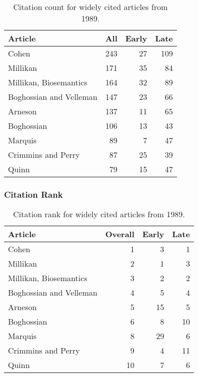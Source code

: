 \documentclass[
  10pt,
  letterpaper,
  DIV=11,
  numbers=noendperiod,
  twoside]{scrartcl}
\begin{document}
\begin{longtable}[]{@{}lrrr@{}}

\caption{\label{tbl-citation-count-1989}Citation count for widely cited
articles from 1989.}

\tabularnewline

\toprule\noalign{}
Article & All & Early & Late \\
\midrule\noalign{}
\endhead
\bottomrule\noalign{}
\endlastfoot
Cohen & 243 & 27 & 109 \\
Millikan & 171 & 35 & 84 \\
Millikan, Biosemantics & 164 & 32 & 89 \\
Boghossian and Velleman & 147 & 23 & 66 \\
Arneson & 137 & 11 & 65 \\
Boghossian & 106 & 13 & 43 \\
Marquis & 89 & 7 & 47 \\
Crimmins and Perry & 87 & 25 & 39 \\
Quinn & 79 & 15 & 47 \\

\end{longtable}

\subsubsection*{Citation Rank}\label{sec-rank-1989}

\begin{longtable}[]{@{}lrrr@{}}

\caption{\label{tbl-citation-rank-1989}Citation rank for widely cited
articles from 1989.}

\tabularnewline

\toprule\noalign{}
Article & Overall & Early & Late \\
\midrule\noalign{}
\endhead
\bottomrule\noalign{}
\endlastfoot
Cohen & 1 & 3 & 1 \\
Millikan & 2 & 1 & 3 \\
Millikan, Biosemantics & 3 & 2 & 2 \\
Boghossian and Velleman & 4 & 5 & 4 \\
Arneson & 5 & 15 & 5 \\
Boghossian & 6 & 8 & 10 \\
Marquis & 8 & 29 & 6 \\
Crimmins and Perry & 9 & 4 & 11 \\
Quinn & 10 & 7 & 6 \\

\end{longtable}
\end{document}
